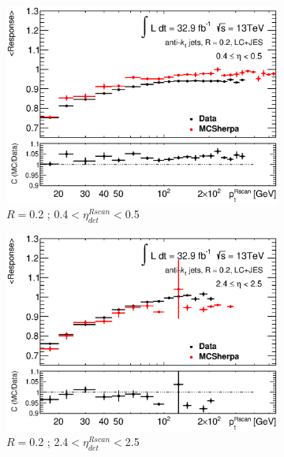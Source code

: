 \begin{figure}[ht]
    \centering
    \begin{subfigure}[b]{0.495\textwidth}
        \centering
        \includegraphics[width=\textwidth]{images/ResponseRatio2LC_49_Sherpa}
        \caption{$R=$0.2 ; 0.4$<\eta^{Rscan}_{det}<$0.5}
    \end{subfigure}
    \hfill
    \begin{subfigure}[b]{0.495\textwidth}
        \centering
        \includegraphics[width=\textwidth]{images/ResponseRatio2LC_69_Sherpa}
        \caption{$R=$0.2 ; 2.4$<\eta^{Rscan}_{det}<$2.5}
    \end{subfigure}
    \vfill
    \begin{subfigure}[b]{0.495\textwidth}

\end{subfigure}
\end{figure}
